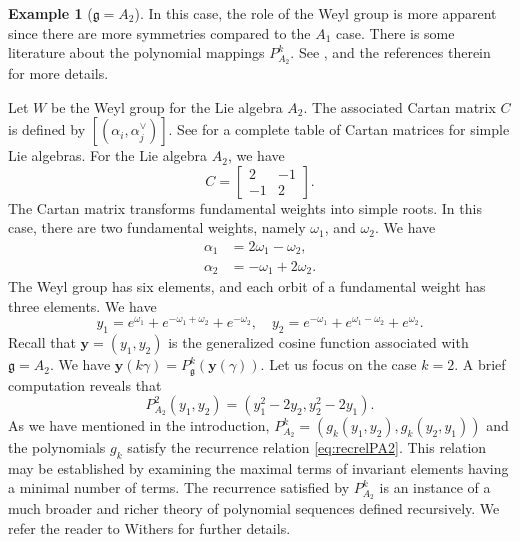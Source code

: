 \documentclass{amsart}
\newcommand{\mf}{\mathfrak}
\numberwithin{equation}{section}
\theoremstyle{plain}
\theoremstyle{definition}
\newtheorem{example}[theorem]{Example}
\begin{document}
\begin{example}[$\mf{g}=A_2$]\label{ex:PA2}
In this case, the role of the Weyl group is more apparent since there are more symmetries compared to the $A_1$ case. There is some literature about the polynomial mappings $P^k_{A_2}$. See \cite{kuc07,lidlwells, uchimura}, and the references therein for more details. 

Let $W$ be the Weyl group for the Lie algebra $A_2$. The associated Cartan matrix $C$ is defined by $[ (\alpha_i , \alpha_j^\vee )]$. See \cite{humphreys-lie1978} for a complete table of Cartan matrices for simple Lie algebras. For the Lie algebra $A_2$, we have
$$
C=\begin{bmatrix}2&-1\\-1&2\end{bmatrix}.
$$
The Cartan matrix transforms fundamental weights into simple roots. In this case, there are two fundamental weights, namely $\omega_1$, and $\omega_2$. We have
\begin{align*}
	\alpha_1 &= 2\omega_1 - \omega_2,\\
	\alpha_2 &= -\omega_1 +2\omega_2.
\end{align*}
The Weyl group has six elements, and each orbit of a fundamental weight has three elements. We have
\begin{equation}\label{eq:y_1andy_2}
	y_1 =e^{\omega_1}+e^{-\omega_1+\omega_2}+e^{-\omega_2}, 
	\quad y_2 =e^{-\omega_1}+e^{\omega_1-\omega_2}+e^{\omega_2}.
\end{equation}
Recall that $\mathbf{y}=(y_1,y_2)$ is the generalized cosine function associated with $\mf{g}=A_2$. We have $\mathbf{y}(k\gamma)=P_\mf{g}^k(\mathbf{y}(\gamma))$. Let us focus on the case $k=2$. A brief computation reveals that	$$P_{A_2}^2(y_1,y_2)=(y_1^2-2y_2,y_2^2-2y_1).$$
As we have mentioned in the introduction, $P^k_{A_2}=(g_k(y_1,y_2),g_k(y_2,y_1))$ and the polynomials $g_k$ satisfy the recurrence relation \eqref{eq:recrelPA2}. 
This relation may be established by examining the maximal terms of invariant elements having a minimal number of terms. The recurrence satisfied by $P_{A_2}^k$ is an instance of a much broader and richer theory of polynomial sequences defined recursively. We refer the reader to Withers \cite{withers1988} for further details.
\end{example}
\end{document}
